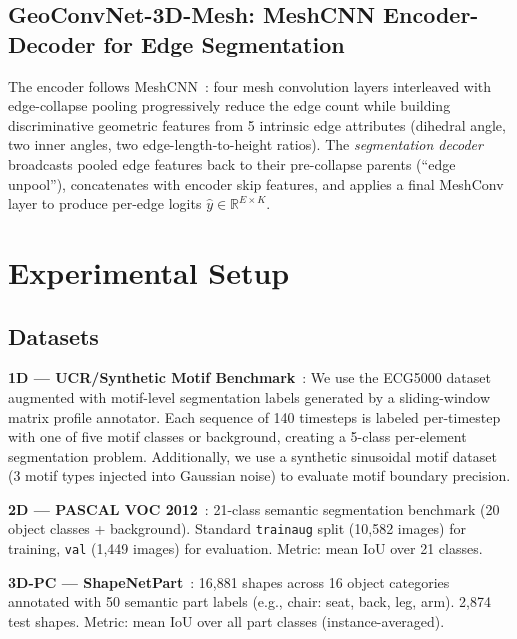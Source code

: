 \documentclass[10pt,conference]{IEEEtran}
\newcommand{\R}{\mathbb{R}}
\begin{document}
\subsection{GeoConvNet-3D-Mesh: MeshCNN Encoder-Decoder for Edge Segmentation}

The encoder follows MeshCNN~\cite{hanocka2019meshcnn}: four mesh
convolution layers interleaved with edge-collapse pooling progressively
reduce the edge count while building discriminative geometric features
from 5 intrinsic edge attributes (dihedral angle, two inner angles, two
edge-length-to-height ratios).  The \emph{segmentation decoder} broadcasts
pooled edge features back to their pre-collapse parents (``edge unpool''),
concatenates with encoder skip features, and applies a final MeshConv layer
to produce per-edge logits $\hat{y}\in\R^{E\times K}$.

\section{Experimental Setup}
\label{sec:experiments}

\subsection{Datasets}

\noindent\textbf{1D --- UCR/Synthetic Motif Benchmark}~\cite{dau2019ucr}:
We use the ECG5000 dataset augmented with motif-level segmentation labels
generated by a sliding-window matrix profile annotator.  Each sequence of
140 timesteps is labeled per-timestep with one of five motif classes or
background, creating a 5-class per-element segmentation problem.
Additionally, we use a synthetic sinusoidal motif dataset (3 motif types
injected into Gaussian noise) to evaluate motif boundary precision.

\noindent\textbf{2D --- PASCAL VOC 2012}~\cite{everingham2010pascal}:
21-class semantic segmentation benchmark (20 object classes + background).
Standard \texttt{trainaug} split (10{,}582 images) for training,
\texttt{val} (1{,}449 images) for evaluation.  Metric: mean IoU over 21
classes.

\noindent\textbf{3D-PC --- ShapeNetPart}~\cite{chang2015shapenet}:
16{,}881 shapes across 16 object categories annotated with 50 semantic
part labels (e.g., chair: seat, back, leg, arm).  2{,}874 test shapes.
Metric: mean IoU over all part classes (instance-averaged).
\end{document}
